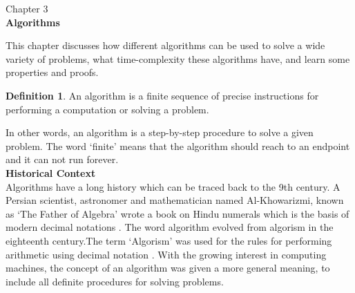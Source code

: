 \documentclass[11pt]{article}
\theoremstyle{plain}
\theoremstyle{definition}
\newtheorem{defn}[thm]{Definition}
\begin{document}
\begin{center}
\end{center}


\begin{center}
\large{Chapter 3}\\
\huge{\bfseries Algorithms}
\end{center}

	

This chapter discusses how different algorithms can be used to solve a wide variety of problems, what time-complexity these algorithms have, and learn some properties and proofs.


\begin{defn}
An algorithm is a finite sequence of precise instructions for performing a computation or solving a problem.
\cite{rosen:1}

\end{defn}
In other words, an algorithm is a step-by-step procedure to solve a given problem. The word ‘finite’ means that the algorithm should reach to an endpoint and it can not run forever.\\

\setlength{\parindent}{0pt}\textbf{Historical Context}\\
Algorithms have a long history which can be traced back to the 9th century.  A Persian scientist, astronomer and mathematician named Al-Khowarizmi, known as ‘The Father of Algebra’ wrote a book on Hindu numerals which is the basis of modern decimal notations \cite{Schönhart:2}. The word algorithm evolved from algorism in the eighteenth century.The term ‘Algorism’ was used for the rules for performing arithmetic using decimal notation \cite{rosen:1}. With the growing interest in computing machines, the concept of an algorithm was given a more general meaning, to include all definite procedures for solving problems.\\
\end{document}
